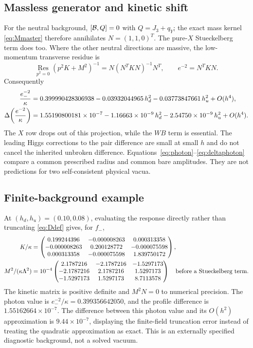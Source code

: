 \documentclass[11pt,letterpaper]{article}
\begin{document}
\subsection{Massless generator and kinetic shift}

For the neutral background, $[\mathcal B,Q]=0$ with $Q=J_3+q_Y$; the exact mass kernel \eqref{eq:Mmaster} therefore annihilates $N=(1,1,0)^T$. The pure-$X$ Stueckelberg term does too. Where the other neutral directions are massive, the low-momentum transverse residue is
\begin{equation}
 \underset{p^2=0}{\operatorname{Res}}(p^2K+M^2)^{-1}
 =N(N^TKN)^{-1}N^T,\qquad e^{-2}=N^TKN.
\end{equation}
Consequently
\begin{align}
 \frac{e^{-2}_-}{\kappa}
 &=0.399990428306938-0.03932044965\,h_d^2-0.03773847661\,h_u^2+O(h^4),\label{eq:photon}\\
 \Delta\!\left(\frac{e^{-2}}\kappa\right)
 &=1.55190800181\times10^{-7}
   -1.16663\times10^{-9}\,h_d^2-2.54750\times10^{-9}\,h_u^2+O(h^4).
 \label{eq:deltaphoton}
\end{align}
The $X$ row drops out of this projection, while the $WB$ term is essential. The leading Higgs corrections to the pair difference are small at small $h$ and do not cancel the inherited unbroken difference. Equations~\eqref{eq:photon}--\eqref{eq:deltaphoton} compare a common prescribed radius and common bare amplitudes. They are not predictions for two self-consistent physical vacua.

\subsection{Finite-background example}

At $(h_d,h_u)=(0.10,0.08)$, evaluating the response directly rather than truncating \eqref{eq:Ddef} gives, for $f_-$,
\begin{align}
 K/\kappa&=\begin{pmatrix}0.199244396 & -0.000008263 & 0.000313358\\-0.000008263 & 0.200128772 & -0.000075598\\0.000313358 & -0.000075598 & 1.839750172\end{pmatrix},\\
 M^2/(\kappa\Lambda^2)&=10^{-4}\begin{pmatrix}2.1787216 & -2.1787216 & -1.5297173\\-2.1787216 & 2.1787216 & 1.5297173\\-1.5297173 & 1.5297173 & 8.7113578\end{pmatrix}
 \quad\hbox{before a Stueckelberg term}.
\end{align}
The kinetic matrix is positive definite and $M^2N=0$ to numerical precision. The photon value is $e^{-2}_-/\kappa=0.399356642050$, and the profile difference is $1.55162664\times10^{-7}$. The difference between this photon value and its $O(h^2)$ approximation is $9.44\times10^{-7}$, displaying the finite-field truncation error instead of treating the quadratic approximation as exact. This is an externally specified diagnostic background, not a solved vacuum.
\end{document}
